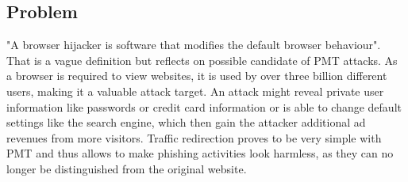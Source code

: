 \subsection{Problem}
"A browser hijacker is software that modifies the default browser behaviour"\cite{automatedspywarecollection}. That is a  vague definition but reflects on possible candidate of \gls{PMT} attacks. As a browser is required to view websites, it is used by over three billion \cite{cia} different users, making it a valuable attack target. An attack might reveal private user information like passwords or credit card information or is able to change default settings like the search engine, which then gain the attacker additional ad revenues from more visitors. Traffic redirection proves to be very simple with \gls{PMT} and thus allows to make phishing activities look harmless, as they can no longer be distinguished from the original website.